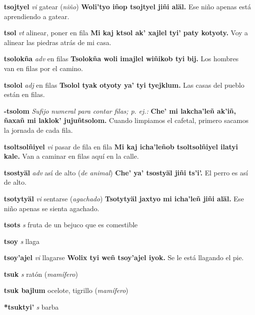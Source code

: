 \documentclass[10pt]{scrbook}
\newcommand{\entry}[1]{\textbf{#1}}
\newcommand{\nontranslationdef}[1]{\textit{#1}}
\newcommand{\partofspeech}[1]{\textit{#1}}
\newcommand{\spanishtranslation}[1]{#1}
\newcommand{\clarification}[1]{(\textit{#1})}
\newcommand{\cholexample}[1]{\textbf{#1}}
\newcommand{\exampletranslation}[1]{#1}
\begin{document}
\begin{multicols}{2}
\entry{tsojtyel}
\partofspeech{vi}
\spanishtranslation{gatear}
\clarification{niño}
\cholexample{Woli'tyo iñop tsojtyel jiñi aläl.}
\exampletranslation{Ese niño apenas está aprendiendo a gatear.}

\entry{tsol}
\partofspeech{vt}
\spanishtranslation{alinear, poner en fila}
\cholexample{Mi kaj ktsol ak' xajlel tyi' paty kotyoty.}
\exampletranslation{Voy a alinear las piedras atrás de mi casa.}

\entry{tsolokña}
\partofspeech{adv}
\spanishtranslation{en filas}
\cholexample{Tsolokña woli imajlel wiñikob tyi bij.}
\exampletranslation{Los hombres van en filas por el camino.}

\entry{tsolol}
\partofspeech{adj}
\spanishtranslation{en filas}
\cholexample{Tsolol tyak otyoty ya' tyi tyejklum.}
\exampletranslation{Las casas del pueblo están en filas.}

\entry{-tsolom}
\nontranslationdef{Sufijo numeral para contar filas; p. ej.:}
\cholexample{Che' mi lakcha'leñ ak'iñ, ñaxañ mi laklok' jujuñtsolom.}
\exampletranslation{Cuando limpiamos el cafetal, primero sacamos la jornada de cada fila.}

\entry{tsoltsolñiyel}
\partofspeech{vi}
\spanishtranslation{pasar de fila en fila}
\cholexample{Mi kaj icha'leñob tsoltsolñiyel ilatyi kale.}
\exampletranslation{Van a caminar en filas aquí en la calle.}

\entry{tsostyäl}
\partofspeech{adv}
\spanishtranslation{así de alto}
\clarification{de animal}
\cholexample{Che' ya' tsostyäl jiñi ts'i'.}
\exampletranslation{El perro es así de alto.}

\entry{tsotytyäl}
\partofspeech{vi}
\spanishtranslation{sentarse}
\clarification{agachado}
\cholexample{Tsotytyäl jaxtyo mi icha'leñ jiñi aläl.}
\exampletranslation{Ese niño apenas se sienta agachado.}

\entry{tsots}
\partofspeech{s}
\spanishtranslation{fruta de un bejuco que es comestible}

\entry{tsoy}
\partofspeech{s}
\spanishtranslation{llaga}

\entry{tsoy'ajel}
\partofspeech{vi}
\spanishtranslation{llagarse}
\cholexample{Wolix tyi weñ tsoy'ajel iyok.}
\exampletranslation{Se le está llagando el pie.}

\entry{tsuk}
\partofspeech{s}
\spanishtranslation{ratón}
\clarification{mamífero}

\entry{tsuk bajlum}
\spanishtranslation{ocelote, tigrillo}
\clarification{mamífero}

\entry{*tsuktyi'}
\partofspeech{s}
\spanishtranslation{barba}


\end{multicols}
\end{document}
